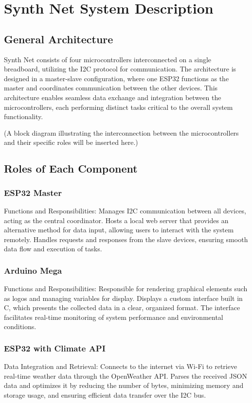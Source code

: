 \documentclass[a4paper,12pt]{report}
\begin{document}
\newpage

\chapter{Synth Net System Description}
\section{General Architecture}
Synth Net consists of four microcontrollers interconnected on a single breadboard, utilizing the I2C protocol for communication. The architecture is designed in a master-slave configuration, where one ESP32 functions as the master and coordinates communication between the other devices. This architecture enables seamless data exchange and integration between the microcontrollers, each performing distinct tasks critical to the overall system functionality.

(A block diagram illustrating the interconnection between the microcontrollers and their specific roles will be inserted here.)
\section{Roles of Each Component}
\subsection{ESP32 Master}
Functions and Responsibilities:
Manages I2C communication between all devices, acting as the central coordinator.
Hosts a local web server that provides an alternative method for data input, allowing users to interact with the system remotely.
Handles requests and responses from the slave devices, ensuring smooth data flow and execution of tasks.
\subsection{Arduino Mega}
Functions and Responsibilities:
Responsible for rendering graphical elements such as logos and managing variables for display.
Displays a custom interface built in C, which presents the collected data in a clear, organized format. The interface facilitates real-time monitoring of system performance and environmental conditions.

\subsection{ESP32 with Climate API}
Data Integration and Retrieval:
Connects to the internet via Wi-Fi to retrieve real-time weather data through the OpenWeather API.
Parses the received JSON data and optimizes it by reducing the number of bytes, minimizing memory and storage usage, and ensuring efficient data transfer over the I2C bus.
\end{document}
